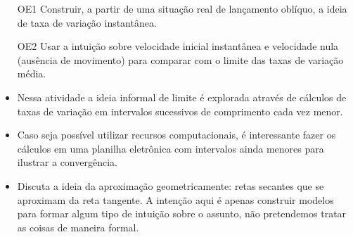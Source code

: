 \documentclass[10 pt,usenames,dvipsnames, oneside]{article}
\begin{document}
\begin{goals}
\begin{enumerate}

\item [OE1] Construir, a partir de uma situação real de lançamento oblíquo, a ideia de taxa de variação instantânea.

\item [OE2] Usar a intuição sobre velocidade inicial instantânea e velocidade nula (ausência de movimento) para comparar com o limite das taxas de variação média.

\end{enumerate}

\tcblower

\begin{itemize}

\item Nessa atividade a ideia informal de limite é explorada através de cálculos de taxas de
variação em intervalos sucessivos de comprimento cada vez menor.
\item Caso seja possível utilizar recursos computacionais, é interessante fazer os cálculos em
uma planilha eletrônica com intervalos ainda menores para ilustrar a convergência.
\item Discuta a ideia da aproximação geometricamente: retas secantes que se aproximam da
reta tangente. A intenção aqui é apenas construir modelos para formar algum tipo de
intuição sobre o assunto, não pretendemos tratar as coisas de maneira formal.

\begin{figure}[H]
\centering

\end{figure}
\end{itemize}
\end{goals}
\end{document}
